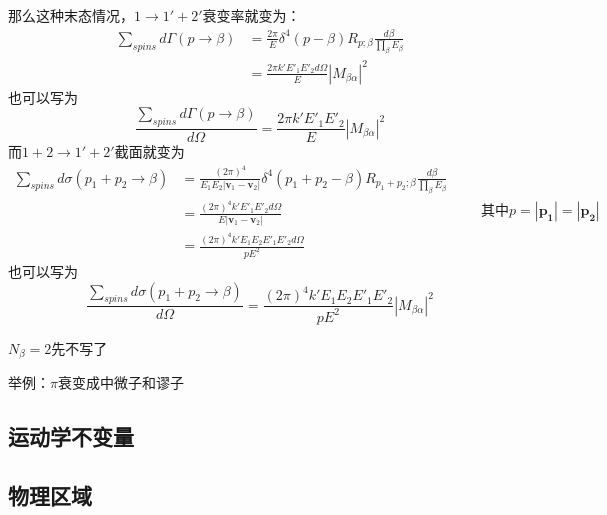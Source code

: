 那么这种末态情况，$1\to1'+2'$衰变率就变为：
\begin{equation}
    \begin{aligned}
        \sum_{spins}d\Gamma(p\to\beta)
        &=\frac{2\pi}{E}\delta^4(p-\beta)R_{p;\beta}\frac{d\beta}{\prod_{\beta}E_{\beta}}
        \\&=\frac{2\pi k'E'_1E'_2d\Omega}{E}|M_{\beta\alpha}|^2
    \end{aligned}
\end{equation}
也可以写为
\begin{equation}
    \frac{\sum_{spins}d\Gamma(p\to\beta)}{d\Omega}=\frac{2\pi k'E'_1E'_2}{E}|M_{\beta\alpha}|^2
\end{equation}
而$1+2\to1'+2'$截面就变为
\begin{equation}
    \begin{aligned}
            \sum_{spins}d\sigma(p_1+p_2\to\beta)
            &=
            \frac{(2\pi)^4}{E_1E_2|\boldsymbol{v}_1-\boldsymbol{v}_2|}\delta^4(p_1+p_2-\beta)R_{p_1+p_2;\beta}\frac{d\beta}{\prod_{\beta}E_{\beta}}\\
            &=
            \frac{(2\pi)^4k'E'_1E'_2d\Omega}{E|\boldsymbol{v}_1-\boldsymbol{v}_2|}
            \\&=
            \frac{(2\pi)^4k'E_1E_2E'_1E'_2d\Omega}{pE^2}
    \end{aligned}\qquad \text{其中}p=|\boldsymbol{p_1}|=|\boldsymbol{p_2}|
\end{equation}
也可以写为
\begin{equation}
    \frac{\sum_{spins}d\sigma(p_1+p_2\to\beta)}{d\Omega}=\frac{(2\pi)^4k'E_1E_2E'_1E'_2}{pE^2}|M_{\beta\alpha}|^2
\end{equation}


$N_{\beta}=2$先不写了

举例：$\pi$衰变成中微子和谬子

\subsection{运动学不变量}
\subsection{物理区域}
